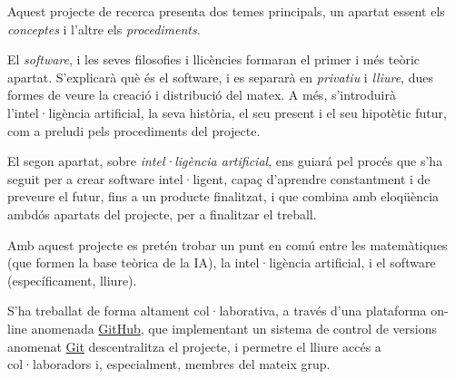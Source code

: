 Aquest projecte de recerca presenta dos temes principals, un apartat essent els
\emph{conceptes} i l'altre els \emph{procediments}.

El \emph{software}, i les seves filosofies i llicències formaran el primer i més
teòric apartat. S'explicarà què és el software, i es separarà en \emph{privatiu}
i \emph{lliure}, dues formes de veure la creació i distribució del matex. A més,
s'introduirà l'intel·ligència artificial, la seva història, el seu present i el
seu hipotètic futur, com a preludi pels procediments del projecte.

El segon apartat, sobre \emph{intel·ligència artificial}, ens guiará pel procés
que s'ha seguit per a crear software intel·ligent, capaç d'aprendre constantment
i de preveure el futur, fins a un producte finalitzat, i que combina amb eloqüència
ambdós apartats del projecte, per a finalitzar el treball.

Amb aquest projecte es pretén trobar un punt en comú entre les matemàtiques (que
formen la base teòrica de la IA), la intel·ligència artificial, i el software
(específicament, lliure).

S'ha treballat de forma altament col·laborativa, a través d'una plataforma
on-line anomenada \href{http://github.com}{GitHub}, que implementant un sistema
de control de versions anomenat \href{http://git-scm.com/}{Git} descentralitza
el projecte, i permetre el lliure accés a col·laboradors i, especialment, membres
del mateix grup.
